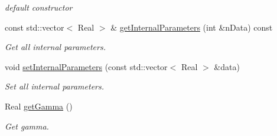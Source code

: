 \begin{DoxyCompactItemize}
\begin{DoxyCompactList}\small\item\em default constructor \item\end{DoxyCompactList}\item 
\hypertarget{classvoom_1_1_luo_rudy_ae2937f3f4dd7d3726ae54f335141fd84}{
const std::vector$<$ Real $>$ \& \hyperlink{classvoom_1_1_luo_rudy_ae2937f3f4dd7d3726ae54f335141fd84}{getInternalParameters} (int \&nData) const }
\label{classvoom_1_1_luo_rudy_ae2937f3f4dd7d3726ae54f335141fd84}

\begin{DoxyCompactList}\small\item\em Get all internal parameters. \item\end{DoxyCompactList}\item 
\hypertarget{classvoom_1_1_luo_rudy_a1acd944cbd8d06e94d87276516084757}{
void \hyperlink{classvoom_1_1_luo_rudy_a1acd944cbd8d06e94d87276516084757}{setInternalParameters} (const std::vector$<$ Real $>$ \&data)}
\label{classvoom_1_1_luo_rudy_a1acd944cbd8d06e94d87276516084757}

\begin{DoxyCompactList}\small\item\em Set all internal parameters. \item\end{DoxyCompactList}\item 
\hypertarget{classvoom_1_1_luo_rudy_a698189fa1a8c96e7b443f95a9d7887be}{
Real \hyperlink{classvoom_1_1_luo_rudy_a698189fa1a8c96e7b443f95a9d7887be}{getGamma} ()}
\label{classvoom_1_1_luo_rudy_a698189fa1a8c96e7b443f95a9d7887be}

\begin{DoxyCompactList}\small\item\em Get gamma. \item\end{DoxyCompactList}\end{DoxyCompactItemize}
